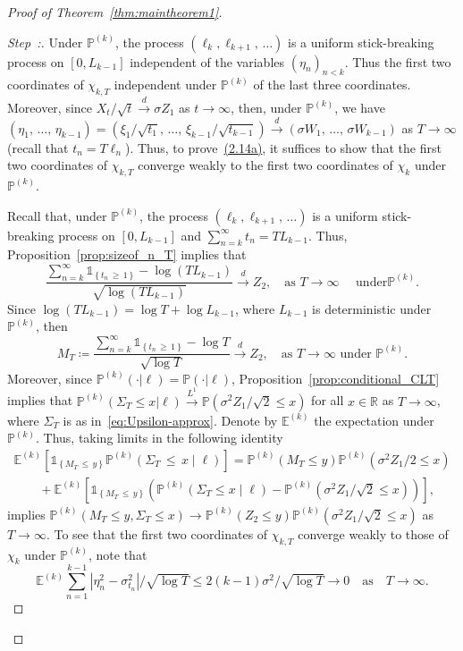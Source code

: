 \documentclass[AHL,Unicode,longabstracts,published]{cedram}
\newcommand\R{\mathbb{R}}
\newcommand\E{\mathds{E}}
\newcommand\p{\mathds{P}}
\newcommand\1{\mathds{1}}
\newcommand\cid{\xrightarrow{d}}
\newcommand\ciL{\xrightarrow{L^1}}
\newcounter{stepcount}
\newenvironment{step}{\refstepcounter{stepcount}\begin{proof}[Step~\thestepcount:]}{\let\qed\relax\end{proof}}
\begin{document}
\begin{proof}[Proof of Theorem~\ref{thm:maintheorem1}]
\begin{step}
Under $\p^{(k)}$, the process $(\ell_k,\ell_{k+1},\,\ldots)$ is a uniform stick-breaking process on $[0,L_{k-1}]$ independent of the variables $(\eta_n)_{n<k}$. Thus the first two coordinates of $\chi_{k,T}$ independent under $\p^{(k)}$ of the last three coordinates. Moreover, since $X_t/\sqrt{t}\cid \sigma Z_1$ as $t\to\infty$, then, under $\p^{(k)}$, we have $(\eta_1,\,\ldots,\,\eta_{k-1}) =(\xi_1/\sqrt{t_1},\,\ldots,\,\xi_{k-1}/\sqrt{t_{k-1}}) \cid(\sigma W_1,\,\ldots,\,\sigma W_{k-1})$ as $T\to\infty$ (recall that $t_n=T\ell_n$). Thus, to prove~\hyperref[eq:quintuple-Billingsley]{(2.14a)}, it suffices to show that the first two coordinates of $\chi_{k,T}$ converge weakly to the first two coordinates of $\chi_k$ under $\p^{(k)}$.

Recall that, under $\p^{(k)}$, the process $(\ell_k,\ell_{k+1},\,\ldots)$ is a uniform stick-breaking process on $[0,L_{k-1}]$ and $\sum_{n=k}^\infty t_n=TL_{k-1}$. Thus, Proposition~\ref{prop:sizeof_n_T} implies that
\[
\frac{\sum\limits_{n=k}^\infty\1_{\left\{t_n\,\ge\, 1\right\}}-\log \left(TL_{k-1}\right)}{\sqrt{\log \left(TL_{k-1}\right)}}
\cid Z_2,
\quad \text{as }T\to\infty\quad\text{ under}\p^{(k)}.
\]
Since $\log(TL_{k-1})=\log T+\log L_{k-1}$, where $L_{k-1}$ is deterministic under $\p^{(k)}$, then
\[
M_T\coloneqq\frac{\sum\limits_{n=k}^\infty\1_{\left\{t_n\,\ge\,1\right\}}-\log T}{\sqrt{\log T}}
\cid Z_2,
\quad \text{as $T\to\infty$ under $\p^{(k)}$.}
\]
Moreover, since $\p^{(k)}(\cdot|\ell)=\p(\cdot|\ell)$, Proposition~\ref{prop:conditional_CLT} implies that $\p^{(k)}(\Sigma_T\le x|\ell)\ciL\p(\sigma^2Z_1/\sqrt{2}\le x)$ for all $x\in\R$ as $T\to\infty$, where $\Sigma_T$ is as in~\eqref{eq:Upsilon-approx}. Denote by $\E^{(k)}$ the expectation under $\p^{(k)}$. Thus, taking limits in the following identity
\begin{multline*}
\E^{(k)} \left[\1_{\left\{M_T\,\le\,y\right\}}\p^{(k)}\left(\Sigma_T\,\le\,x\middle|\ell\right)\right] =
\p^{(k)}\left(M_T\le y\right)\p^{(k)}\left(\sigma^2Z_1/2\le x\right)\\
\qquad+\E^{(k)}\left[\1_{\left\{M_T\,\le\,y\right\}} \left(\p^{(k)}\left(\Sigma_T\le x\middle|\ell\right)-\p^{(k)}\left(\sigma^2Z_1/\sqrt{2}\le x\right)\right)\right],
\end{multline*}
implies $\p^{(k)}(M_T\le y,\Sigma_T\le x)\to \p^{(k)}(Z_2\le y)\p^{(k)}(\sigma^2Z_1/\sqrt{2}\le x)$ as $T\to\infty$. To see that the first two coordinates of $\chi_{k,T}$ converge weakly to those of $\chi_k$ under $\p^{(k)}$, note that
\[
\E^{(k)}\sum_{n=1}^{k-1} \left|\eta_n^2-\sigma_{t_n}^2\right|/\sqrt{\log T}
\le 2(k-1)\sigma^2/\sqrt{\log T}\to0\quad\text{as}\quad T\to\infty.
\]
\end{step}



\end{proof}
\end{document}
